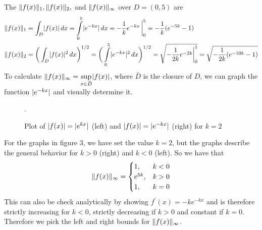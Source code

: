 \documentclass[12pt]{article}
\DeclarePairedDelimiter \abs{\lvert}{\rvert}%
\DeclarePairedDelimiter \norm{\lVert}{\rVert}%
\theoremstyle{remark}
\begin{document}
The $\norm{f(x)}_1, \norm{f(x)}_2,$ and $\norm{f(x)}_\infty$ over $D = (0,5)$ are
\begin{align*}
	\norm{f(x)}_1 & = \int_D \abs{f(x)} \, dx = \int\limits_0^5 \abs{e^{-kx}} \, dx = -\frac{1}{k}e^{-kx} \, \bigg\vert_0^5 = -\frac{1}{k}(e^{-5k} - 1) \\
	\norm{f(x)}_2 & = \bigg(\int_D\abs{f(x)}^2\,dx\bigg)^{1/2} = \bigg(\int\limits_0^5\abs{e^{-kx}}^2\,dx\bigg)^{1/2} = \sqrt{-\frac{1}{2k}e^{-2k}\bigg\vert_0^5} = \sqrt{-\frac{1}{2k}(e^{-10k} - 1)}
\end{align*}
To calculate $\norm{f(x)}_\infty = \sup\limits_{x \in \bar{D}} \abs{f(x)}$, where $\bar{D}$ is the closure of $D$, we can graph the function $\abs{e^{-kx}}$ and visually determine it.
\begin{figure}[H]
	\centering
	\caption{Plot of $\abs{f(x)} = \abs{e^{kx}}$ (left) and $\abs{f(x)} = \abs{e^{-kx}}$ (right) for $k=2$}.
\end{figure}
For the graphs in figure 3, we have set the value $k = 2$, but the graphs describe the general behavior for $k > 0$ (right) and $k < 0$ (left). So we have that 
$$ \norm{f(x)}_\infty = \begin{cases}
1, & k < 0 \\
e^{5k}, & k > 0 \\
1, & k = 0
\end{cases} $$
This can also be check analytically by showing $f^\prime(x) = -ke^{-kx}$ and is therefore strictly increasing for $k < 0$, strictly decreasing if $k > 0$ and constant if $k = 0$. Therefore we pick the left and right bounds for $\norm{f(x)}_\infty$.
\end{document}
